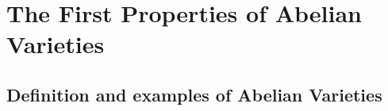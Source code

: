 \section{The First Properties of Abelian Varieties}



    
\subsection{Definition and examples of Abelian Varieties}


